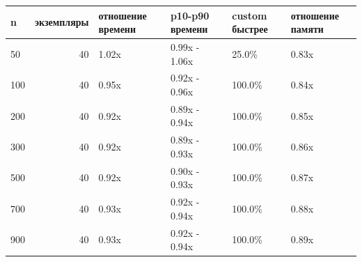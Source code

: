 \begin{tabular}{lrllll}
\toprule
n & экземпляры & отношение времени & p10-p90 времени & custom быстрее & отношение памяти \\
\midrule
50 & 40 & 1.02x & 0.99x - 1.06x & 25.0\% & 0.83x \\
100 & 40 & 0.95x & 0.92x - 0.96x & 100.0\% & 0.84x \\
200 & 40 & 0.92x & 0.89x - 0.94x & 100.0\% & 0.85x \\
300 & 40 & 0.92x & 0.89x - 0.93x & 100.0\% & 0.86x \\
500 & 40 & 0.92x & 0.90x - 0.93x & 100.0\% & 0.87x \\
700 & 40 & 0.93x & 0.92x - 0.94x & 100.0\% & 0.88x \\
900 & 40 & 0.93x & 0.92x - 0.94x & 100.0\% & 0.89x \\
\bottomrule
\end{tabular}
